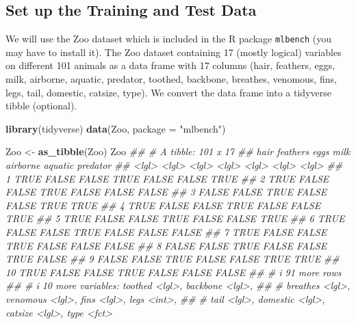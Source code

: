 \documentclass[
  notitlepage]{book}
\newenvironment{Shaded}{\begin{snugshade}}{\end{snugshade}}
\newcommand{\CommentTok}[1]{\textcolor[rgb]{0.56,0.35,0.01}{\textit{#1}}}
\newcommand{\DataTypeTok}[1]{\textcolor[rgb]{0.13,0.29,0.53}{#1}}
\newcommand{\KeywordTok}[1]{\textcolor[rgb]{0.13,0.29,0.53}{\textbf{#1}}}
\newcommand{\NormalTok}[1]{#1}
\newcommand{\StringTok}[1]{\textcolor[rgb]{0.31,0.60,0.02}{#1}}
\begin{document}
\hypertarget{set-up-the-training-and-test-data}{%
\subsection{Set up the Training and Test Data}\label{set-up-the-training-and-test-data}}

We will use the Zoo dataset which is included in the R package \texttt{mlbench}
(you may have to install it). The Zoo dataset containing 17 (mostly
logical) variables on different 101 animals as a data frame with 17
columns (hair, feathers, eggs, milk, airborne, aquatic, predator,
toothed, backbone, breathes, venomous, fins, legs, tail, domestic,
catsize, type). We convert the data frame into a tidyverse tibble
(optional).

\begin{Shaded}
\begin{Highlighting}[]
\KeywordTok{library}\NormalTok{(tidyverse)}
\KeywordTok{data}\NormalTok{(Zoo, }\DataTypeTok{package =} \StringTok{"mlbench"}\NormalTok{)}

\NormalTok{Zoo \textless{}{-}}\StringTok{ }\KeywordTok{as\_tibble}\NormalTok{(Zoo)}
\NormalTok{Zoo}
\CommentTok{\#\# \# A tibble: 101 x 17}
\CommentTok{\#\#    hair  feathers eggs  milk  airborne aquatic predator}
\CommentTok{\#\#    \textless{}lgl\textgreater{} \textless{}lgl\textgreater{}    \textless{}lgl\textgreater{} \textless{}lgl\textgreater{} \textless{}lgl\textgreater{}    \textless{}lgl\textgreater{}   \textless{}lgl\textgreater{}   }
\CommentTok{\#\#  1 TRUE  FALSE    FALSE TRUE  FALSE    FALSE   TRUE    }
\CommentTok{\#\#  2 TRUE  FALSE    FALSE TRUE  FALSE    FALSE   FALSE   }
\CommentTok{\#\#  3 FALSE FALSE    TRUE  FALSE FALSE    TRUE    TRUE    }
\CommentTok{\#\#  4 TRUE  FALSE    FALSE TRUE  FALSE    FALSE   TRUE    }
\CommentTok{\#\#  5 TRUE  FALSE    FALSE TRUE  FALSE    FALSE   TRUE    }
\CommentTok{\#\#  6 TRUE  FALSE    FALSE TRUE  FALSE    FALSE   FALSE   }
\CommentTok{\#\#  7 TRUE  FALSE    FALSE TRUE  FALSE    FALSE   FALSE   }
\CommentTok{\#\#  8 FALSE FALSE    TRUE  FALSE FALSE    TRUE    FALSE   }
\CommentTok{\#\#  9 FALSE FALSE    TRUE  FALSE FALSE    TRUE    TRUE    }
\CommentTok{\#\# 10 TRUE  FALSE    FALSE TRUE  FALSE    FALSE   FALSE   }
\CommentTok{\#\# \# i 91 more rows}
\CommentTok{\#\# \# i 10 more variables: toothed \textless{}lgl\textgreater{}, backbone \textless{}lgl\textgreater{},}
\CommentTok{\#\# \#   breathes \textless{}lgl\textgreater{}, venomous \textless{}lgl\textgreater{}, fins \textless{}lgl\textgreater{}, legs \textless{}int\textgreater{},}
\CommentTok{\#\# \#   tail \textless{}lgl\textgreater{}, domestic \textless{}lgl\textgreater{}, catsize \textless{}lgl\textgreater{}, type \textless{}fct\textgreater{}}
\end{Highlighting}
\end{Shaded}
\end{document}
